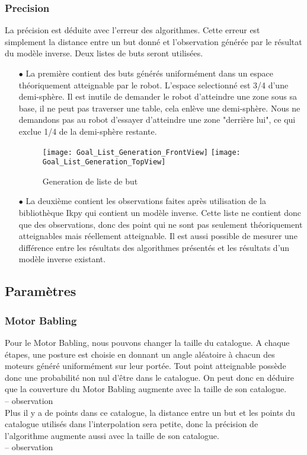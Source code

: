 \documentclass[11pt,french]{report}
\begin{document}
\subsubsection{Precision}
La précision est déduite avec l'erreur des algorithmes. Cette erreur est simplement la distance entre un but donné et l'observation générée par le résultat du modèle inverse. Deux listes de buts seront utilisées.
\begin{itemize}
    \item[$\bullet$] La première contient des buts générés uniformément dans un espace théoriquement atteignable par le robot. L'espace selectionné est 3/4 d'une demi-sphère. Il est inutile de demander le robot d'atteindre une zone sous sa base, il ne peut pas traverser une table, cela enlève une demi-sphère. Nous ne demandons pas au robot d'essayer d'atteindre une zone "derrière lui", ce qui exclue 1/4 de la demi-sphère restante.
    
    \begin{figure}
        \centering
        \texttt{[image: Goal\_List\_Generation\_FrontView]} \texttt{[image: Goal\_List\_Generation\_TopView]}
        \caption{Generation de liste de but}
        \label{fig:goal_list}
    \end{figure}
    
    \item[$\bullet$] La deuxième contient les observations faites après utilisation de la bibliothèque Ikpy qui contient un modèle inverse. Cette liste ne contient donc que des observations, donc des point qui ne sont pas seulement théoriquement atteignables mais réellement atteignable. Il est aussi possible de mesurer une différence entre les résultats des algorithmes présentés et les résultats d'un modèle inverse existant.
\end{itemize}

\subsection{Paramètres}

\subsubsection{Motor Babling}

Pour le Motor Babling, nous pouvons changer la taille du catalogue. A chaque étapes, une posture est choisie en donnant un angle aléatoire à chacun des moteurs généré uniformément sur leur portée. Tout point atteignable possède donc une probabilité non nul d'être dans le catalogue. On peut donc en déduire que la couverture du Motor Babling augmente avec la taille de son catalogue.\\
-- observation\\
Plus il y a de points dans ce catalogue, la distance entre un but et les points du catalogue utilisés dans l'interpolation sera petite, donc la précision de l'algorithme augmente aussi avec la taille de son catalogue.\\
-- observation
\end{document}
